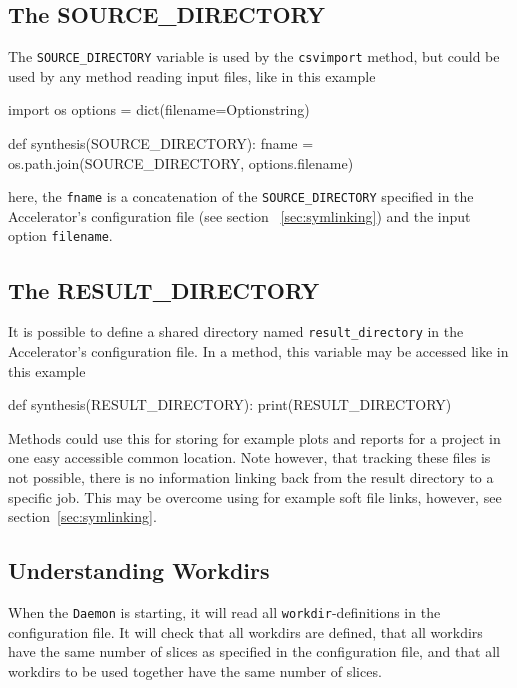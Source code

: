 \subsection{The SOURCE\_DIRECTORY}
\label{sec:SOURCE_DIR}

The \texttt{SOURCE\_DIRECTORY} variable is used by
the \texttt{csvimport} method, but could be used by any method reading
input files, like in this example
\begin{python}
import os
options = dict(filename=Optionstring)

def synthesis(SOURCE_DIRECTORY):
    fname = os.path.join(SOURCE_DIRECTORY, options.filename)
\end{python}
here, the \texttt{fname} is a concatenation of
the \texttt{SOURCE\_DIRECTORY} specified in the Accelerator's
configuration file (see section ~\ref{sec:symlinking}) and the input
option \texttt{filename}.


\subsection{The RESULT\_DIRECTORY}
\label{sec:RESULT_DIR}

It is possible to define a shared directory
named \texttt{result\_directory} in the Accelerator's configuration
file.  In a method, this variable may be accessed like in this example
\begin{python}
def synthesis(RESULT_DIRECTORY):
    print(RESULT_DIRECTORY)
\end{python}
Methods could use this for storing for example plots and reports for a
project in one easy accessible common location.  Note however, that
tracking these files is not possible, there is no information linking
back from the result directory to a specific job.  This may be
overcome using for example soft file links, however, see section~\ref{sec:symlinking}.







\subsection{Understanding Workdirs}
When the \texttt{Daemon} is starting, it will read all
\texttt{workdir}-definitions in the configuration file.  It will check
that all workdirs are defined, that all workdirs have the same number
of slices as specified in the configuration file, and that all
workdirs to be used together have the same number of slices.


